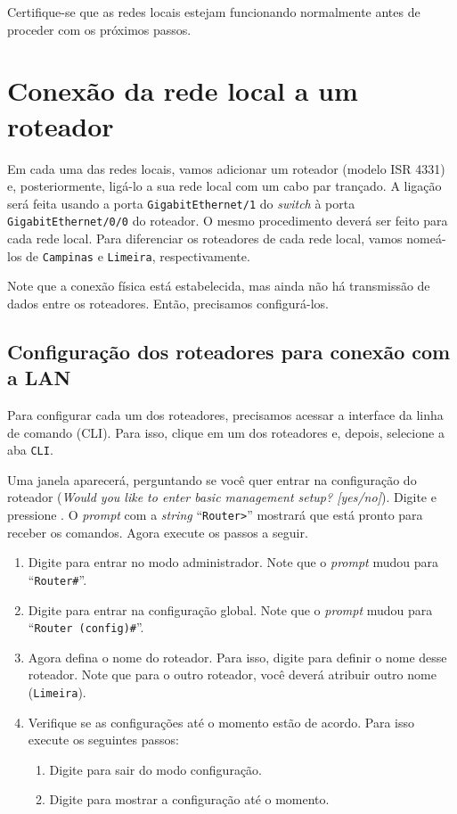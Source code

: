 Certifique-se que as redes locais estejam funcionando normalmente antes de proceder com os próximos passos.

\section{Conexão da rede local a um roteador}\label{sec:conexaoRedeLocalRoteador}
Em cada uma das redes locais, vamos adicionar um roteador (modelo ISR 4331) e, posteriormente, ligá-lo a sua rede local com um cabo par trançado. A ligação será feita usando a porta \texttt{Gi\-ga\-bit\-Ether\-net/1} do \textit{switch} à porta \texttt{Gi\-ga\-bit\-Ether\-net/0/0} do roteador. O mesmo procedimento deverá ser feito para cada rede local. Para diferenciar os roteadores de cada rede local, vamos nomeá-los de \texttt{Campinas} e \texttt{Limeira}, respectivamente. 

Note que a conexão física está estabelecida, mas ainda não há transmissão de dados entre os roteadores. Então, precisamos configurá-los.

\subsection{Configuração dos roteadores para conexão com a LAN}\label{subsec:configRoreadores}
Para configurar cada um dos roteadores, precisamos acessar a interface da linha de comando (CLI). Para isso, clique em um dos roteadores e, depois, selecione a aba \texttt{CLI}.

Uma janela aparecerá, perguntando se você quer entrar na configuração do roteador (\textit{Would you like to enter basic management setup? [yes/no]}). Digite  e pressione \keys{\enter}. O \textit{prompt} com a \textit{string} \enquote{\texttt{Router>}} mostrará que está pronto para receber os comandos. Agora execute os passos a seguir.

\begin{enumerate}[label*=\arabic*.]
    \item Digite  para entrar no modo administrador. Note que o \textit{prompt} mudou para \enquote{\texttt{Router\#}}.
    \item Digite  para entrar na configuração global. Note que o \textit{prompt} mudou para \enquote{\texttt{Router (config)\#}}.
    \item Agora defina o nome do roteador. Para isso, digite  para definir o nome desse roteador. Note que para o outro roteador, você deverá atribuir outro nome (\texttt{Limeira}).
    \item Verifique se as configurações até o momento estão de acordo. Para isso execute os seguintes passos:
    \begin{enumerate}[label*=\arabic*.]
        \item Digite  para sair do modo configuração.
        \item Digite  para mostrar a configuração até o momento.
    \end{enumerate}
\end{enumerate}

